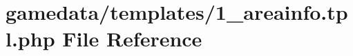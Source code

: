 \hypertarget{1__areainfo_8tpl_8php}{\section{gamedata/templates/1\+\_\+areainfo.tpl.\+php File Reference}
\label{1__areainfo_8tpl_8php}
}
